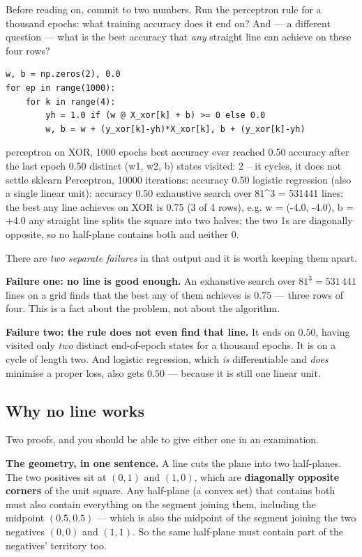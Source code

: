 \documentclass[11pt]{article}
\begin{document}
Before reading on, commit to two numbers. Run the perceptron rule for a
thousand epochs: what training accuracy does it end on? And --- a different
question --- what is the best accuracy that \emph{any} straight line can
achieve on these four rows?

\begin{lstlisting}
w, b = np.zeros(2), 0.0
for ep in range(1000):
    for k in range(4):
        yh = 1.0 if (w @ X_xor[k] + b) >= 0 else 0.0
        w, b = w + (y_xor[k]-yh)*X_xor[k], b + (y_xor[k]-yh)
\end{lstlisting}
\begin{codeout}
perceptron on XOR, 1000 epochs
   best accuracy ever reached      0.50
   accuracy after the last epoch   0.50
   distinct (w1, w2, b) states visited: 2 -- it cycles, it does not settle
   sklearn Perceptron, 10000 iterations: accuracy 0.50
   logistic regression (also a single linear unit): accuracy 0.50
   exhaustive search over 81^3 = 531441 lines: the best any line achieves
   on XOR is 0.75 (3 of 4 rows), e.g. w = (-4.0, -4.0), b = +4.0
   any straight line splits the square into two halves; the two 1s are
   diagonally opposite, so no half-plane contains both and neither 0.
\end{codeout}

There are \emph{two separate failures} in that output and it is worth keeping
them apart.

\textbf{Failure one: no line is good enough.} An exhaustive search over
$81^3 = 531\,441$ lines on a grid finds that the best any of them achieves is
$\mathbf{0.75}$ --- three rows of four. This is a fact about the problem, not
about the algorithm.

\textbf{Failure two: the rule does not even find that line.} It ends on
$\mathbf{0.50}$, having visited only \emph{two} distinct end-of-epoch states
for a thousand epochs. It is on a cycle of length two. And logistic
regression, which \emph{is} differentiable and \emph{does} minimise a proper
loss, also gets $0.50$ --- because it is still one linear unit.

\subsection{Why no line works}
\label{sec:xorproof}

Two proofs, and you should be able to give either one in an examination.

\textbf{The geometry, in one sentence.} A line cuts the plane into two
half-planes. The two positives sit at $(0,1)$ and $(1,0)$, which are
\textbf{diagonally opposite corners} of the unit square. Any half-plane (a
convex set) that contains both must also contain everything on the segment
joining them, including the midpoint $(0.5, 0.5)$ --- which is also the
midpoint of the segment joining the two negatives $(0,0)$ and $(1,1)$. So the
same half-plane must contain part of the negatives' territory too.
\end{document}
